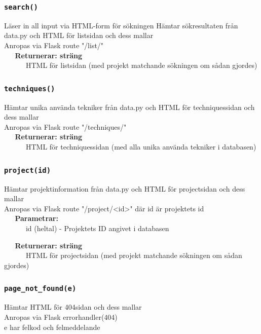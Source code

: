 \documentclass{TDP003mall}
\begin{document}
\subsubsection{\texttt{search()}}
Läser in all input via HTML-form för sökningen
Hämtar sökresultaten från data.py och HTML för listsidan och dess mallar\\
Anropas via Flask route "/list/"\\

\verb|   |\textbf{Returnerar: sträng}\\
\verb|   |\verb|   |HTML för listsidan (med projekt matchande sökningen om sådan gjordes)


\subsubsection{\texttt{techniques()}}
Hämtar unika använda tekniker från data.py och HTML för techniquessidan och dess mallar\\
Anropas via Flask route "/techniques/"\\

\verb|   |\textbf{Returnerar: sträng}\\
\verb|   |\verb|   |HTML för techniquessidan (med alla unika använda tekniker i databasen)

\subsubsection{\texttt{project(id)}}
Hämtar projektinformation från data.py och HTML för projectsidan och dess mallar\\
Anropas via Flask route "/project/<id>" där id är projektets id\\

\verb|   |\textbf{Parametrar:}\\
\verb|   |\verb|   |id (heltal) - Projektets ID angivet i databasen

\verb|   |\textbf{Returnerar: sträng}\\
\verb|   |\verb|   |HTML för projectsidan (med projekt matchande sökningen om sådan gjordes)

\subsubsection{\texttt{page\_not\_found(e)}}
Hämtar HTML för 404sidan och dess mallar\\
Anropas via Flask errorhandler(404)\\
e har felkod och felmeddelande\\
\end{document}
